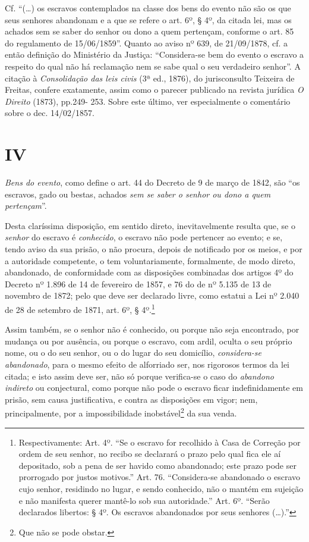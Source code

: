 {  Cf. ``(\ldots{}) os escravos contemplados na classe dos bens do evento não
  são os que seus senhores abandonam e a que se refere o art. 6º, § 4º,
  da citada lei, mas os achados sem se saber do senhor ou dono a quem
  pertençam, conforme o art. 85 do regulamento de 15/06/1859''. Quanto ao
  aviso nº 639, de 21/09/1878, cf. a então definição do Ministério da
  Justiça: ``Considera-se bem do evento o escravo a respeito do qual não
  há reclamação nem se sabe qual o seu verdadeiro senhor''. A citação à
  \emph{Consolidação das leis civis} (3ª ed., 1876), do jurisconsulto
  Teixeira de Freitas, confere exatamente, assim como o parecer
  publicado na revista jurídica \emph{O Direito} (1873), pp.249- 253.
  Sobre este último, ver especialmente o comentário sobre o dec.
  14/02/1857.}

\section*{IV}

\emph{Bens do evento}, como define o art. 44 do Decreto de 9 de março de
1842, são ``os escravos, gado ou bestas, achados \emph{sem se saber o
senhor ou dono a quem pertençam}''.

Desta claríssima disposição, em sentido direto, inevitavelmente resulta
que, se o \emph{senhor} do escravo é \emph{conhecido}, o escravo não
pode pertencer ao evento; e se, tendo aviso da sua prisão, o não
procura, depois de notificado por os meios, e por a autoridade
competente, o tem voluntariamente, formalmente, de modo direto,
abandonado, de conformidade com as disposições combinadas dos artigos 4º
do Decreto nº 1.896 de 14 de fevereiro de 1857, e 76 do de nº 5.135 de
13 de novembro de 1872; pelo que deve ser declarado livre, como estatui
a Lei nº 2.040 de 28 de setembro de 1871, art. 6º, § 4º.\footnote{
  Respectivamente: Art. 4º. ``Se o escravo for recolhido à Casa de
  Correção por ordem de seu senhor, no recibo se declarará o prazo pelo
  qual fica ele aí depositado, sob a pena de ser havido como abandonado;
  este prazo pode ser prorrogado por justos motivos.'' Art. 76.
  ``Considera-se abandonado o escravo cujo senhor, residindo no lugar, e
  sendo conhecido, não o mantém em sujeição e não manifesta querer
  mantê-lo sob sua autoridade.'' Art. 6º. ``Serão declarados libertos: § 4º.
  Os escravos abandonados por seus senhores (\ldots{}).''}

Assim também, se o senhor não é conhecido, ou porque não seja
encontrado, por mudança ou por ausência, ou porque o escravo, com ardil,
oculta o seu próprio nome, ou o do seu senhor, ou o do lugar do seu
domicílio, \emph{considera-se abandonado}, para o mesmo efeito de
alforriado ser, nos rigorosos termos da lei citada; e isto assim deve
ser, não só porque verifica-se o caso do \emph{abandono indireto} ou
conjectural, como porque não pode o escravo ficar indefinidamente em
prisão, sem causa justificativa, e contra as disposições em vigor; nem,
principalmente, por a impossibilidade inobstável\footnote{Que não se
  pode obstar.} da sua venda.

